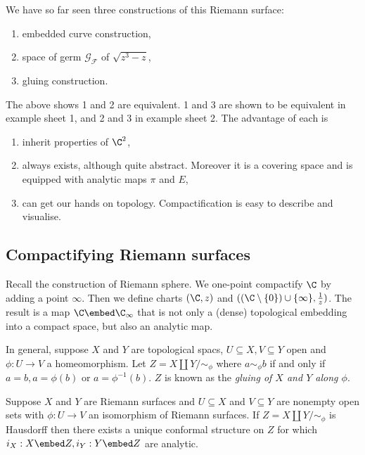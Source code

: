 \documentclass[a4paper]{article}
\begin{document}
We have so far seen three constructions of this Riemann surface:
\begin{enumerate}
\item embedded curve construction,
\item space of germ \(\mathcal G_{\mathcal F}\) of \(\sqrt{z^3 - z}\),
\item gluing construction.
\end{enumerate}
The above shows 1 and 2 are equivalent. 1 and 3 are shown to be equivalent in example sheet 1, and 2 and 3 in example sheet 2. The advantage of each is
\begin{enumerate}
\item inherit properties of \(\C^2\),
\item always exists, although quite abstract. Moreover it is a covering space and is equipped with analytic maps \(\pi\) and \(E\),
\item can get our hands on topology. Compactification is easy to describe and visualise.
\end{enumerate}

\subsection{Compactifying Riemann surfaces}

Recall the construction of Riemann sphere. We one-point compactify \(\C\) by adding a point \(\infty\). Then we define charts \((\C, z)\) and \(((\C\setminus \{0\}) \cup \{\infty\}, \frac{1}{z})\). The result is a map \(\C \embed \C_\infty\) that is not only a (dense) topological embedding into a compact space, but also an analytic map.

In general, suppose \(X\) and \(Y\) are topological spacs, \(U \subseteq X, V \subseteq Y\) open and \(\phi: U \to V\) a homeomorphism. Let \(Z = X \amalg Y / \sim_\phi\) where \(a \sim_\phi b\) if and only if \(a = b, a = \phi(b)\) or \(a = \phi^{-1}(b)\). \(Z\) is known as the \emph{gluing of \(X\) and \(Y\) along \(\phi\)}.

\begin{proposition}
  Suppose \(X\) and \(Y\) are Riemann surfaces and \(U \subseteq X\) and \(V \subseteq Y\) are nonempty open sets with \(\phi: U \to V\) an isomorphism of Riemann surfaces. If \(Z = X \amalg Y / \sim_\phi\) is Hausdorff then there exists a unique conformal structure on \(Z\) for which \(i_X: X \embed Z, i_Y: Y \embed Z\) are analytic.
\end{proposition}
\end{document}
